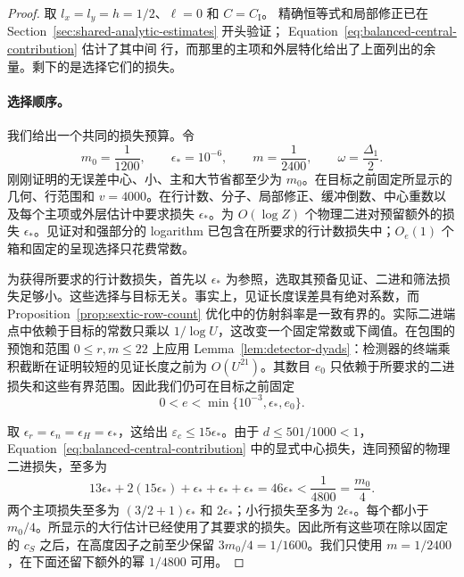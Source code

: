 \documentclass[11pt,a4paper]{article}
\numberwithin{equation}{section}
\numberwithin{figure}{section}
\theoremstyle{definition}
\theoremstyle{remark}
\begin{document}
\begin{proof}
取 $l_x=l_y=h=1/2$、$\ell=0$ 和 $C=C_{\mathrm I}$。
精确恒等式和局部修正已在
Section~\ref{sec:shared-analytic-estimates} 开头验证；
Equation~\eqref{eq:balanced-central-contribution} 估计了其中间
行，而那里的主项和外层特化给出了上面列出的余量。剩下的是选择它们的损失。

\paragraph{选择顺序。}
我们给出一个共同的损失预算。令
\[
 m_0=\frac1{1200},\qquad \epsilon_*=10^{-6},\qquad
 m=\frac1{2400},\qquad \omega=\frac{\Delta_1}{2}.
\]
刚刚证明的无误差中心、小、主和大节省都至少为 $m_0$。在目标之前固定所显示的几何、行范围和 $v=4000$。在行计数、分子、局部修正、缓冲倒数、中心重数以及每个主项或外层估计中要求损失 $\epsilon_*$。为 $O(\log Z)$ 个物理二进对预留额外的损失 $\epsilon_*$。见证对和强部分的 logarithm 已包含在所要求的行计数损失中；$O_e(1)$ 个箱和固定的呈现选择只花费常数。

为获得所要求的行计数损失，首先以 $\epsilon_*$ 为参照，选取其预备见证、二进和筛法损失足够小。这些选择与目标无关。事实上，见证长度误差具有绝对系数，而 Proposition~\ref{prop:sextic-row-count} 优化中的仿射斜率是一致有界的。实际二进端点中依赖于目标的常数只乘以 $1/\log U$，这改变一个固定常数或下阈值。在包围的预饱和范围
$0\le r,m\le22$ 上应用
Lemma~\ref{lem:detector-dyads}：检测器的终端乘积截断在证明较短的见证长度之前为 $O(U^{21})$。其数目 $e_0$ 只依赖于所要求的二进损失和这些有界范围。因此我们仍可在目标之前固定
\[
 0<e<\min\{10^{-3},\epsilon_*,e_0\}.
\]

取 $\epsilon_r=\epsilon_n=\epsilon_H=\epsilon_*$，这给出
$\varepsilon_c\le15\epsilon_*$。由于 $d\le501/1000<1$，Equation~\eqref{eq:balanced-central-contribution} 中的显式中心损失，连同预留的物理二进损失，至多为
\[
 13\epsilon_*+2(15\epsilon_*)+\epsilon_*+\epsilon_*+\epsilon_*
 =46\epsilon_*<\frac1{4800}=\frac{m_0}{4}.
\]
两个主项损失至多为 $(3/2+1)\epsilon_*$ 和
$2\epsilon_*$；小行损失至多为 $2\epsilon_*$。每个都小于 $m_0/4$。所显示的大行估计已经使用了其要求的损失。因此所有这些项在除以固定的 $c_S$ 之后，在高度因子之前至少保留 $3m_0/4=1/1600$。我们只使用
$m=1/2400$，在下面还留下额外的幂 $1/4800$ 可用。


\end{proof}
\end{document}
